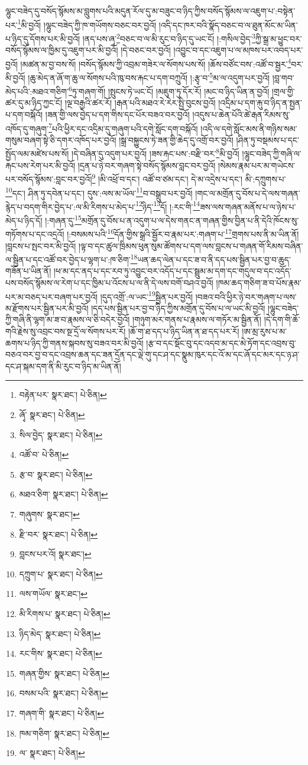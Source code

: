 ལྷུང་བཟེད་དུ་བསོད་སྙོམས་མ་བླུགས་པའི་མདུན་རོལ་དུ་མ་བཟུང་བ་ཉིད་ཀྱིས་བསོད་སྙོམས་ལ་འཇུག་པ་:བསྟེན་པར་\footnote{བརྟེན་པར་  སྣར་ཐང་།  པེ་ཅིན། }མི་བྱའོ། །ལྷུང་བཟེད་ཀྱི་ཁ་གཡོགས་བཅང་བར་བྱའོ། །འདི་དང་ཁར་བའི་སྣོད་བཅང་བ་ལ་ཐུན་མོང་མ་ཡིན་པ་ཉིད་དུ་དོགས་པར་མི་བྱའོ། །ནད་པས་ཞྭ་\footnote{ཞྭོ་  སྣར་ཐང་།  པེ་ཅིན། }བཅང་བ་ལ་མི་རུང་བ་ཉིད་དུ་ཡང་ངོ། །:གསིལ་བྱེད་\footnote{སིལ་བྱེད་  སྣར་ཐང་།  པེ་ཅིན། }ཀྱི་སྒྲ་མ་ཕྱུང་བར་བསོད་སྙོམས་ལ་ཁྱིམ་དུ་འཇུག་པར་མི་བྱའོ། །དེ་བཅང་བར་བྱའོ། །འབྱུང་བ་དང་འཇུག་པ་ལ་མཁས་པར་འབད་པར་བྱའོ། །མཚན་མ་བྱ་བས་སོ། །བསོད་སྙོམས་ཀྱི་འབྲམ་གཟེར་ལ་སོགས་པས་སོ། །ཆོས་བཙོང་བས་:འཚོ་བ་སྦྱར་\footnote{འཚོ་བ་  པེ་ཅིན། }བར་མི་བྱའོ། །ཆུ་མེད་ན་ཞོ་ག་ཆུ་ལ་སོགས་པའི་ཁུ་བས་རྐང་པ་དག་བཀྲུའོ། །:རྩྭ་བ་\footnote{རྩ་བ་  སྣར་ཐང་།  པེ་ཅིན། }མ་ལ་འདུག་པར་བྱའོ། །བླ་གབ་མེད་པའི་:མཐའ་གཅིག་\footnote{མཐའ་ཅིག་  སྣར་ཐང་།  པེ་ཅིན། }ཏུ་གཞག་གོ། །སྤུངས་ཏེ་ཡང་ངོ། །མཇུག་ཏུ་དོར་རོ། །མང་བ་ཉིད་ཡིན་ན་བྱའོ། །གྲལ་གྱི་ཚར་དུ་མ་ཉིད་ཀྱང་ངོ། །ལྔ་བརྒྱའི་ཚར་རོ། །རྒན་པའི་མཐའ་རེ་རེར་སྤྱི་བུངས་བྱའོ། །འདྲིམ་པ་དག་རྐུ་བ་ཉིད་ན་སྤྱན་པ་དག་བསྐོའོ། །ཟན་གྱི་ལས་བྱེད་པ་དག་གིས་དང་པོར་བཟའ་བར་བྱའོ། །འདུས་པ་ཆེན་པོའི་ཚེ་རྒན་རིམས་སུ་འཁོད་དུ་གཞུག་\footnote{གཞུགས་  སྣར་ཐང་། }པའི་ཕྱིར་དང་འདྲིམ་དུ་གཞུག་པའི་དགེ་སློང་དག་བསྐོའོ། །འདི་ལ་དགེ་སློང་མས་ནི་གཉིས་སམ་གསུམ་བཞག་སྟེ་ཅི་དགར་འཁོད་པར་བྱའོ། །སྒྲ་བསྐྱུངས་ཏེ་ཟན་གྱི་ཆེད་དུ་འགྲོ་བར་བྱའོ། །ཤིན་ཏུ་བསྡམས་པ་དང་སྤྱོད་ལམ་མཛེས་པས་སོ། །དེ་བཞིན་དུ་འདུག་པར་བྱའོ། །ཟས་རྐང་པས་:བརྫི་བར་\footnote{རྫི་བར་  སྣར་ཐང་།  པེ་ཅིན། }མི་བྱའོ། །ལྷུང་བཟེད་ཀྱི་གཞི་ལ་རྐང་པས་རེག་པར་མི་བྱའོ། །དྲན་པ་ཉེ་བར་གཞག་སྟེ་བསོད་སྙོམས་བླང་བར་བྱའོ། །སེམས་རྣམ་པར་མ་གཡེངས་པར་བསོད་སྙོམས་:བླང་བར་བྱའོ།\footnote{བླངས་པར་འོ།  སྣར་ཐང་། } །མི་འཕྲོ་བ་དང་། འཚོ་བ་ཙམ་དང་། དེ་མ་འདྲེས་པ་དང་། མི་:དཀྲུགས་པ་\footnote{དཀྲུག་པ་  སྣར་ཐང་།  པེ་ཅིན། }དང་། ཤིན་ཏུ་དབེན་པ་དང་། དུས་:ལས་མ་ཡོལ་\footnote{ལས་གཡོལ་  སྣར་ཐང་། }བ་བསྒྲུབ་པར་བྱའོ། །གང་ལ་མགྲོན་དུ་བོས་པ་དེ་ལས་གཞན་རྙེད་པ་བདག་གིར་བྱེད་པ་:ལ་མི་རིགས་པ་མེད་པ་\footnote{མི་རིགས་པ་  སྣར་ཐང་།  པེ་ཅིན། }ཉིད་\footnote{ཉིད་མེད་  སྣར་ཐང་།  པེ་ཅིན། }དོ། །:རང་གི་\footnote{རང་གིས་  སྣར་ཐང་།  པེ་ཅིན། }ཟས་ལས་གཞན་མནོས་པ་ལ་ཉེས་པ་མེད་པ་ཉིད་དོ། །:གཞན་དུ་\footnote{གཞན་གྱིས་  སྣར་ཐང་།  པེ་ཅིན། }མགྲོན་དུ་བོས་པ་ན་འདུག་པ་ལ་དེས་གནང་ན་གཞན་གྱིས་བྱིན་པ་ནི་དེའི་ཁོངས་སུ་གཏོགས་པ་དང་འདྲའོ། །:བསམས་པའི་\footnote{བསམ་པའི་  སྣར་ཐང་།  པེ་ཅིན། }དོན་གྱིས་སྒྲའི་སྦྱོར་བ་རྣམ་པར་:གཞག་པ་\footnote{གཞག་གི་  སྣར་ཐང་།  པེ་ཅིན། }གྲགས་པས་ནི་མ་ཡིན་ནོ། །བླངས་པ་སྤང་བར་མི་བྱའོ། །ལྟ་བ་དང་ཚུལ་ཁྲིམས་ཕུན་སུམ་ཚོགས་པ་དག་ལས་བླངས་པ་གཞན་གོ་རིམས་བཞིན་ལ་སྦྱིན་པ་དང་འཚོ་བར་བྱེད་པ་ལྷག་པ་:ཁ་ཅིག་\footnote{ཁམ་གཅིག་  སྣར་ཐང་།  པེ་ཅིན། }ཡན་ཆད་ལེན་པ་དང་ཟ་བ་ནི་དད་པས་སྦྱིན་པར་བྱ་བ་ཆུད་གཟོན་པ་ཡིན་ནོ། །ཕ་མ་དང་ནད་པ་དང་རབ་ཏུ་འབྱུང་བར་འདོད་པ་དང་སྦྲུམ་མ་དག་དང་གདུལ་བ་དང་འདོད་པས་བསོད་སྙོམས་ལ་རེག་པ་དང་ཁྱིམ་པ་འོངས་པ་ལ་ནི་དེ་ལས་བགོ་བཤའ་བྱའོ། །ཁམ་ཆད་གཅིག་ཟ་བ་པོས་རྣམ་པར་མ་བཅད་པར་བཞག་པར་བྱའོ། །དུད་འགྲོ་:ལ་ཡང་\footnote{ལ་  སྣར་ཐང་།  པེ་ཅིན། }སྦྱིན་པར་བྱའོ། །བཟའ་བའི་ཕྱིར་ཉེ་བར་གཞག་པ་ལས་མ་རྫོགས་པར་སྦྱིན་པར་མི་བྱའོ། །དད་པས་སྦྱིན་པར་བྱ་བ་ཉིད་ཀྱིས་མགྲོན་དུ་བོས་པ་ལ་ཡང་མི་བྱའོ། །ལྷུང་བཟེད་ཀྱི་གཞི་ནི་ལྷག་མ་ཟ་བ་རྣམས་ལ་ཅི་བདེར་བྱའོ། །གཉུག་མར་གནས་པ་རྣམས་ལ་གཏོར་མ་སྦྱིན་ནོ། །དེ་དག་གི་ཆོ་གའི་རྗེས་སུ་འབྲང་བས་སྔ་དྲོ་ལ་སོགས་པར་རོ། །ཆོ་ག་ཐ་དད་པ་ཉིད་ཡིན་ན་ཐ་དད་པར་རོ། །ཨ་མྲ་རུས་པ་མ་ཆགས་པ་ཉིད་ཀྱི་གནས་སྐབས་སུ་བཟའ་བར་མི་བྱའོ། །རྩ་བ་དང་སྡོང་བུ་དང་འདབ་མ་དང་མེ་ཏོག་དང་འབྲས་བུ་བཅའ་བར་བྱ་བ་དང་འབྲས་ཆན་དང་ཟན་དྲོན་དང་ལྡེ་གུ་དང་ཤ་དང་སྣུམ་ཁུར་དང་འོ་མ་དང་ཞོ་དང་མར་དང་ཉ་ཤ་དང་ཤ་སྐམ་དག་ནི་མི་རུང་བ་ཉིད་མ་ཡིན་ནོ། 